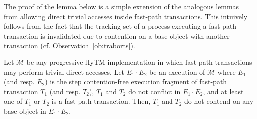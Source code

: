 The proof of the lemma below is a simple extension of the analogous lemmas from \cite{hytm14disc}
allowing direct trivial accesses inside fast-path transactions. This intuively follows from the fact that
the tracking set of a process executing a fast-path transaction is invalidated due to contention on a base
object with another transaction (cf. Observation~\ref{ob:traborts}).
%
\begin{lemma}
\label{lm:hytm}
%
Let $\mathcal{M}$ be any progressive HyTM implementation in which fast-path transactions may perform trivial
direct accesses.
Let $E_1 \cdot E_2$ be an execution of $\mathcal{M}$ where
$E_1$ (and resp. $E_2$) is the step contention-free
execution fragment of fast-path transaction $T_1$ (and resp. $T_2$),
$T_1$ and $T_2$ do not conflict in $E_1 \cdot E_2$, and
at least one of $T_1$ or $T_2$ is a fast-path transaction. 
Then, $T_1$ and $T_2$ do not contend on any base object in $E_1 \cdot E_2$.
\end{lemma}
%
% 
% 
% 
